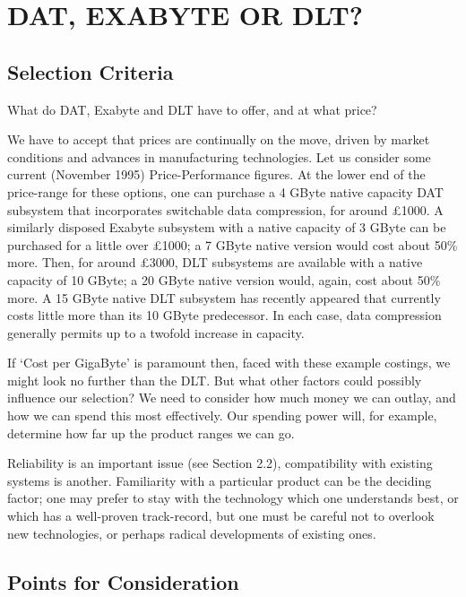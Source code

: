 \section {DAT, EXABYTE OR DLT?}

\subsection {Selection Criteria}

What do DAT, Exabyte and DLT have to offer, and at what price?

We have to accept that prices are continually on the move, driven by market
conditions and advances in manufacturing technologies. Let us consider some
current (November 1995) Price-Performance figures. At the lower end of the
price-range for these options, one can purchase a 4 GByte native capacity
DAT subsystem that incorporates switchable data compression, for around
\pounds 1000. A similarly disposed Exabyte subsystem with a native capacity
of 3 GByte can be purchased for a little over \pounds 1000; a 7 GByte native
version would cost about 50\% more. Then, for around \pounds 3000, DLT
subsystems are available with a native capacity of 10 GByte; a 20 GByte
native version would, again, cost about 50\% more. A 15 GByte native DLT
subsystem has recently appeared that currently costs little more than
its 10 GByte predecessor. In each case, data compression generally permits
up to a twofold increase in capacity.

If `Cost per GigaByte' is paramount then, faced with these example costings,
we might look no further than the DLT. But what other factors could possibly
influence our selection? We need to consider how much money we can outlay,
and how we can spend this most effectively. Our spending power will, for
example, determine how far up the product ranges we can go.

Reliability is an important issue (see Section 2.2), compatibility with
existing systems is another. Familiarity with a particular product can be
the deciding factor; one may prefer to stay with the technology which one
understands best, or which has a well-proven track-record, but one must be
careful not to overlook new technologies, or perhaps radical developments
of existing ones.

\subsection {Points for Consideration}

